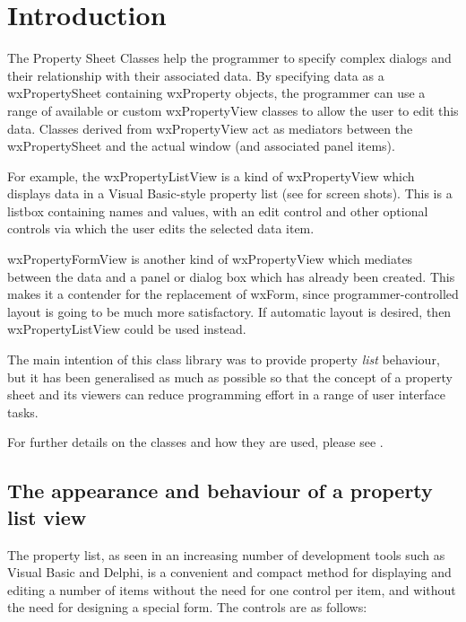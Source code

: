 \chapter{Introduction}\label{introduction}
%
%
\setfooter{\thepage}{}{}{}{}{\thepage}%

The Property Sheet Classes help the programmer to specify complex dialogs and
their relationship with their associated data. By specifying data as a
wxPropertySheet containing wxProperty objects, the programmer can use
a range of available or custom wxPropertyView classes to allow the user to
edit this data. Classes derived from wxPropertyView act as mediators between the
wxPropertySheet and the actual window (and associated panel items).

For example, the wxPropertyListView is a kind of wxPropertyView which displays
data in a Visual Basic-style property list (see  for
screen shots). This is a listbox containing names and values, with
an edit control and other optional controls via which the user edits the selected
data item.

wxPropertyFormView is another kind of wxPropertyView which mediates between
the data and a panel or dialog box which has already been created. This makes it a contender for
the replacement of wxForm, since programmer-controlled layout is going to be much more
satisfactory. If automatic layout is desired, then wxPropertyListView could be used instead.

The main intention of this class library was to provide property {\it list} behaviour, but
it has been generalised as much as possible so that the concept of a property sheet and its viewers
can reduce programming effort in a range of user interface tasks.

For further details on the classes and how they are used, please see .

\section{The appearance and behaviour of a property list view}\label{appearance}

The property list, as seen in an increasing number of development tools
such as Visual Basic and Delphi, is a convenient and compact method for
displaying and editing a number of items without the need for one
control per item, and without the need for designing a special form. The
controls are as follows:

